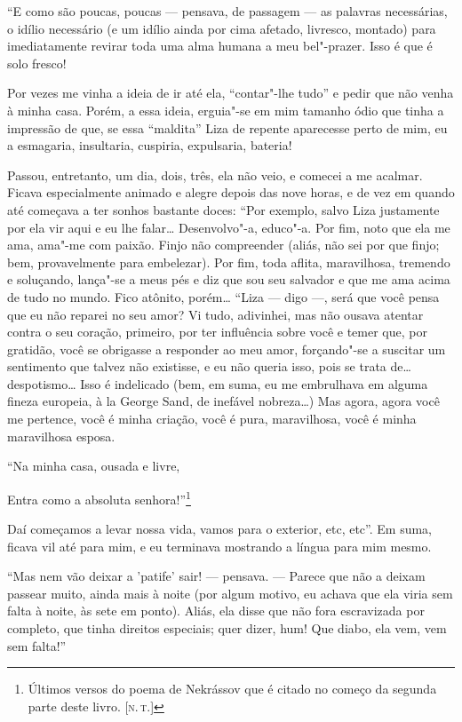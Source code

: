 ``E como são poucas, poucas --- pensava, de passagem --- as palavras
necessárias, o idílio necessário (e um idílio ainda por cima afetado,
livresco, montado) para imediatamente revirar toda uma alma humana a meu
bel"-prazer. Isso é que é solo fresco!

Por vezes me vinha a ideia de ir até ela, ``contar"-lhe tudo'' e pedir
que não venha à minha casa. Porém, a essa ideia, erguia"-se em mim
tamanho ódio que tinha a impressão de que, se essa ``maldita'' Liza de
repente aparecesse perto de mim, eu a esmagaria, insultaria, cuspiria,
expulsaria, bateria!

Passou, entretanto, um dia, dois, três, ela não veio, e comecei a me
acalmar. Ficava especialmente animado e alegre depois das nove horas, e
de vez em quando até começava a ter sonhos bastante doces: ``Por
exemplo, salvo Liza justamente por ela vir aqui e eu lhe falar\ldots{}
Desenvolvo"-a, educo"-a. Por fim, noto que ela me ama, ama"-me com paixão.
Finjo não compreender (aliás, não sei por que finjo; bem, provavelmente
para embelezar). Por fim, toda aflita, maravilhosa, tremendo e
soluçando, lança"-se a meus pés e diz que sou seu salvador e que me ama
acima de tudo no mundo. Fico atônito, porém\ldots{} ``Liza --- digo ---, será
que você pensa que eu não reparei no seu amor? Vi tudo, adivinhei, mas
não ousava atentar contra o seu coração, primeiro, por ter influência
sobre você e temer que, por gratidão, você se obrigasse a responder ao
meu amor, forçando"-se a suscitar um sentimento que talvez não existisse,
e eu não queria isso, pois se trata de\ldots{} despotismo\ldots{} Isso é
indelicado (bem, em suma, eu me embrulhava em alguma fineza europeia, à
la George Sand, de inefável nobreza\ldots{}) Mas agora, agora você me
pertence, você é minha criação, você é pura, maravilhosa, você é minha
maravilhosa esposa.

``Na minha casa, ousada e livre,

Entra como a absoluta senhora!''\footnote{Últimos versos do poema de
  Nekrássov que é citado no começo da segunda parte deste livro. {[}\textsc{n.\,t.}{]}}

Daí começamos a levar nossa vida, vamos para o exterior, etc, etc''. Em
suma, ficava vil até para mim, e eu terminava mostrando a língua para
mim mesmo.

``Mas nem vão deixar a 'patife' sair! --- pensava. --- Parece que não a
deixam passear muito, ainda mais à noite (por algum motivo, eu achava
que ela viria sem falta à noite, às sete em ponto). Aliás, ela disse que
não fora escravizada por completo, que tinha direitos especiais; quer
dizer, hum! Que diabo, ela vem, vem sem falta!''

